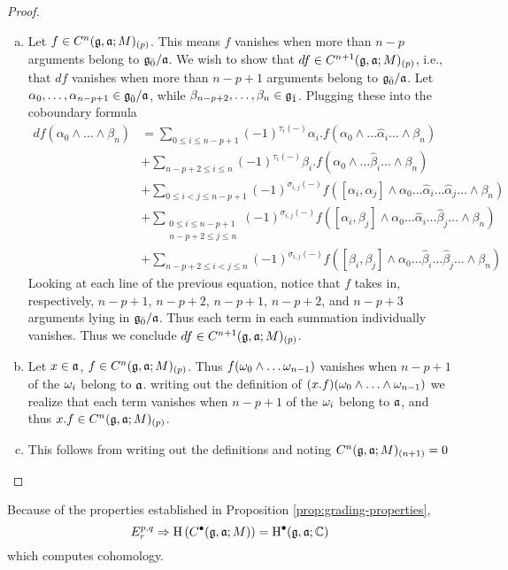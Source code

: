 \begin{proof}
  \begin{enumerate}[(a)]
  \item Let $f \in C^n(\mathfrak{g},\mathfrak{a};M)_{(p)}$. This means $f$ vanishes when more than $n-p$ arguments belong to ${\mathfrak{g}}_{\bar{0}}/\mathfrak{a}$. We wish to show that $df \in C^{n+1}(\mathfrak{g},\mathfrak{a};M)_{(p)}$, i.e., that $df$ vanishes when more than $n-p+1$ arguments belong to ${\mathfrak{g}}_{\bar{0}}/\mathfrak{a}$. Let $\alpha_0, \ldots , \alpha_{n-p+1} \in {\mathfrak{g}}_{\bar{0}}/\mathfrak{a}$, while $\beta_{n-p+2},\ldots,\beta_n \in {\mathfrak{g}}_{\bar{1}}$. Plugging these into the coboundary formula
    \begin{align*}
      df(\alpha_0 \wedge \ldots \wedge \beta_n)
      &= \sum_{0 \leq i \leq n-p+1} (-1)^{\tau_i(-)} \alpha_i . f(\alpha_0 \wedge \ldots \hat \alpha_i \ldots \wedge \beta_n) \\
      & + \sum_{n-p+2 \leq i \leq n} (-1)^{\tau_i(-)} \beta_i .f(\alpha_0 \wedge \ldots \hat \beta_i \ldots \wedge \beta_n) \\
      &+ \sum_{0 \leq i < j \leq n-p+1 } (-1)^{\sigma_{i,j}(-)} f([\alpha_i,\alpha_j] \wedge \alpha_0 \ldots \hat \alpha_i \ldots \hat \alpha_j \ldots \wedge \beta_n) \\
      & + \sum_{\substack{0 \leq i \leq n-p+1 \\ n-p+2 \leq j \leq n}} (-1)^{\sigma_{i,j}(-)} f([\alpha_i,\beta_j]\wedge \alpha_0 \ldots \hat \alpha_i \ldots \hat \beta_j \ldots \wedge \beta_n) \\
      &+ \sum_{n-p+2 \leq i < j \leq n} (-1)^{\sigma_{i,j}(-)} f([\beta_i,\beta_j] \wedge \alpha_0 \ldots \hat \beta_i \ldots \hat \beta_j \ldots \wedge \beta_n)
    \end{align*}
    Looking at each line of the previous equation, notice that $f$ takes in, respectively, $n-p+1$, $n-p+2$, $n-p+1$, $n-p+2$, and $n-p+3$ arguments lying in ${\mathfrak{g}}_{\bar{0}}/\mathfrak{a}$. Thus each term in each summation individually vanishes. Thus we conclude $df \in C^{n+1}(\mathfrak{g},\mathfrak{a};M)_{(p)}$.
  \item Let $x \in \mathfrak{a}$, $f \in C^n(\mathfrak{g},\mathfrak{a};M)_{(p)}$. Thus $f(\omega_0 \wedge \ldots \omega_{n-1})$ vanishes when $n-p+1$ of the $\omega_i$ belong to $\mathfrak{a}$. writing out the definition of $(x.f)(\omega_0\wedge\ldots\wedge\omega_{n-1})$ we realize that each term vanishes when $n-p+1$ of the $\omega_i$ belong to $\mathfrak{a}$, and thus $x.f \in C^n(\mathfrak{g},\mathfrak{a};M)_{(p)}$.
  \item This follows from writing out the definitions and noting $C^n(\mathfrak{g},\mathfrak{a};M)_{(n+1)} = 0$
  \end{enumerate}
\end{proof}
Because of the properties established in Proposition \ref{prop:grading-properties}, 
\begin{equation}
  \label{eq:spectral-sequence}
  E_{r}^{p,q} \Rightarrow \operatorname{H}\left(C^\bullet(\mathfrak{g},\mathfrak{a};M)\right) = \operatorname{H}^\bullet(\mathfrak{g},\mathfrak{a};\mathbb{C})
\end{equation}
which computes cohomology.

